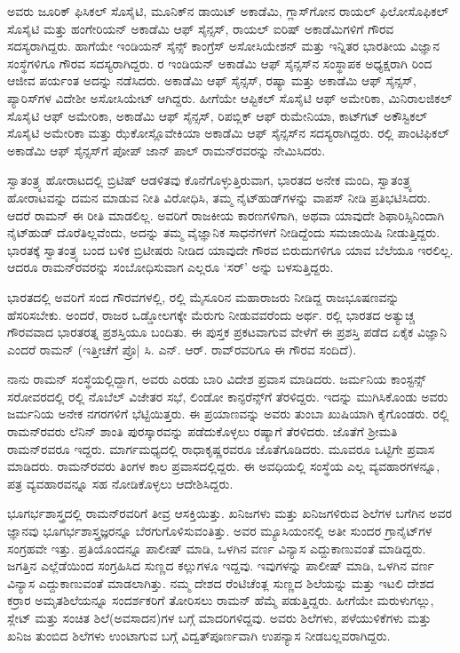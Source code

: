 ಅವರು ಜೂರಿಕ್ ಫಿಸಿಕಲ್ ಸೊಸೈಟಿ, ಮೂನಿಕ್‌ನ ಡಾಯಿಟ್ ಅಕಾಡೆಮಿ, ಗ್ಲಾಸ್‌ಗೋನ ರಾಯಲ್ ಫಿಲೋಸೊಫಿಕಲ್ ಸೊಸೈಟಿ ಮತ್ತು ಹಂಗೇರಿಯನ್ ಅಕಾಡೆಮಿ ಆಫ್ ಸೈನ್ಸಸ್, ರಾಯಲ್ ಐರಿಷ್ ಅಕಾಡೆಮಿಗಳಿಗೆ ಗೌರವ ಸದಸ್ಯರಾಗಿದ್ದರು. ಹಾಗೆಯೇ ಇಂಡಿಯನ್ ಸೈನ್ಸ್ ಕಾಂಗ್ರೆಸ್ ಅಸೋಸಿಯೇಶನ್ ಮತ್ತು ಇನ್ನಿತರ ಭಾರತೀಯ ವಿಜ್ಞಾನ ಸಂಸ್ಥೆಗಳಿಗೂ ಗೌರವ ಸದಸ್ಯರಾಗಿದ್ದರು.  ರ ಇಂಡಿಯನ್ ಅಕಾಡೆಮಿ ಆಫ್ ಸೈನ್ಸಸ್‌ನ ಸಂಸ್ಥಾಪಕ ಅಧ್ಯಕ್ಷರಾಗಿ  ರಿಂದ ಆಜೀವ ಪರ್ಯಂತ ಅದನ್ನು ನಡೆಸಿದರು. ಅಕಾಡೆಮಿ ಆಫ್ ಸೈನ್ಸಸ್, ರಷ್ಯಾ ಮತ್ತು ಅಕಾಡೆಮಿ ಆಫ್ ಸೈನ್ಸಸ್, ಪ್ಯಾರಿಸ್‍ಗಳ ವಿದೇಶೀ ಅಸೋಸಿಯೇಟ್ ಆಗಿದ್ದರು. ಹೀಗೆಯೇ ಆಪ್ಟಿಕಲ್ ಸೊಸೈಟಿ ಆಫ್ ಅಮೇರಿಕಾ, ಮಿನಿರಾಲಜಿಕಲ್ ಸೊಸೈಟಿ ಆಫ್ ಅಮೇರಿಕಾ, ಅಕಾಡೆಮಿ ಆಫ್ ಸೈನ್ಸಸ್, ರಿಪಬ್ಲಿಕ್ ಆಫ್ ರುಮೇನಿಯಾ, ಕಾಟ್‍ಗಟ್ ಅಕೌಸ್ಟಿಕಲ್ ಸೊಸೈಟಿ ಅಮೇರಿಕಾ ಮತ್ತು ಝೆಕೋಸ್ಲೊವೇಕಿಯಾ ಅಕಾಡೆಮಿ ಆಫ್ ಸೈನ್ಸಸ್‌ನ ಸದಸ್ಯರಾಗಿದ್ದರು.  ರಲ್ಲಿ ಪಾಂಟಿಫಿಕಲ್ ಅಕಾಡೆಮಿ ಆಫ್ ಸೈನ್ಸಸ್‌ಗೆ ಪೋಪ್ ಜಾನ್ ಪಾಲ್ ರಾಮನ್‍ರವರನ್ನು ನೇಮಿಸಿದರು.

ಸ್ವಾತಂತ್ರ್ಯ ಹೋರಾಟದಲ್ಲಿ ಬ್ರಿಟಿಷ್ ಆಡಳಿತವು ಕೊನೆಗೊಳ್ಳುತ್ತಿರುವಾಗ, ಭಾರತದ ಅನೇಕ ಮಂದಿ, ಸ್ವಾತಂತ್ರ್ಯ ಹೋರಾಟವನ್ನು ದಮನ ಮಾಡುವ ನೀತಿ ವಿರೋಧಿಸಿ, ತಮ್ಮ ನೈಟ್‍ಹುಡ್‍‌ಗಳನ್ನು ವಾಪಸ್ ನೀಡಿ ಪ್ರತಿಭಟಿಸಿದರು. ಆದರೆ ರಾಮನ್‍ ಈ ರೀತಿ ಮಾಡಲಿಲ್ಲ. ಅವರಿಗೆ ರಾಜಕೀಯ ಕಾರಣಗಳಿಗಾಗಿ, ಅಥವಾ ಯಾವುದೇ ಶಿಫಾರಿಸ್ಸಿನಿಂದಾಗಿ ನೈಟ್‍ಹುಡ್ ದೊರೆತಿಲ್ಲವೆಂದು, ಅದನ್ನು ತಮ್ಮ ವೈಜ್ಞಾನಿಕ ಸಾಧನೆಗಳಗೆ ನೀಡಿದ್ದೆಂದು ಸಮಜಾಯಿಷಿ ನೀಡುತ್ತಿದ್ದರು. ಭಾರತಕ್ಕೆ ಸ್ವಾತಂತ್ರ್ಯ ಬಂದ ಬಳಿಕ ಬ್ರಿಟೀಷರು ನೀಡಿದ ಯಾವುದೇ ಗೌರವ ಬಿರುದುಗಳಿಗೂ ಯಾವ ಬೆಲೆಯೂ ಇರಲಿಲ್ಲ. ಆದರೂ ರಾಮನ್‍ರವರನ್ನು ಸಂಬೋಧಿಸುವಾಗ ಎಲ್ಲರೂ ‘ಸರ್‍’ ಅನ್ನು ಬಳಸುತ್ತಿದ್ದರು.

ಭಾರತದಲ್ಲಿ ಅವರಿಗೆ ಸಂದ ಗೌರವಗಳಲ್ಲಿ,  ರಲ್ಲಿ ಮೈಸೂರಿನ ಮಹಾರಾಜರು ನೀಡಿದ್ದ ರಾಜಭೂಷಣವನ್ನು ಹೆಸರಿಸಬೇಕು. ಅಂದರೆ, ರಾಜರ ಒಡ್ಡೋಲಗಕ್ಕೇ ಮೆರುಗು ನೀಡುವವರೆಂದು ಅರ್ಥ. ರಲ್ಲಿ ಭಾರತದ ಅತ್ಯುಚ್ಚ ಗೌರವವಾದ ಭಾರತರತ್ನ ಪ್ರಶಸ್ತಿಯೂ ಬಂದಿತು. ಈ ಪುಸ್ತಕ ಪ್ರಕಟವಾಗುವ ವೇಳೆಗೆ ಈ ಪ್ರಶಸ್ತಿ ಪಡೆದ ಏಕೈಕ ವಿಜ್ಞಾನಿ ಎಂದರೆ ರಾಮನ್ (ಇತ್ತೀಚೆಗೆ ಪ್ರೊ| ಸಿ. ಎನ್. ಆರ್. ರಾವ್‌ರವರಿಗೂ ಈ ಗೌರವ ಸಂದಿದೆ).

ನಾನು ರಾಮನ್ ಸಂಸ್ಥೆಯಲ್ಲಿದ್ದಾಗ, ಅವರು ಎರಡು ಬಾರಿ ವಿದೇಶ ಪ್ರವಾಸ ಮಾಡಿದರು. ಜರ್ಮನಿಯ ಕಾಂಸ್ಟನ್ಸ್ ಸರೋವರದಲ್ಲಿ  ರಲ್ಲಿ ನೊಬೆಲ್ ವಿಜೇತರ ಸಭೆ, ಲಿಂಡೋ ಕಾನ್ಫರೆನ್ಸ್‌ಗೆ ತೆರಳಿದ್ದರು. ಇದನ್ನು ಮುಗಿಸಿಕೊಂಡು ಅವರು ಜರ್ಮನಿಯ ಅನೇಕ ನಗರಗಳಿಗೆ ಭೆಟ್ಟಿಯಿತ್ತರು. ಈ ಪ್ರಯಾಣವನ್ನು ಅವರು ತುಂಬಾ ಖುಷಿಯಾಗಿ ಕೈಗೊಂಡರು. ರಲ್ಲಿ ರಾಮನ್‍ರವರು ಲೆನಿನ್ ಶಾಂತಿ ಪುರಸ್ಕಾರವನ್ನು ಪಡೆದುಕೊಳ್ಳಲು ರಷ್ಯಾಗೆ ತೆರಳಿದರು. ಜೊತೆಗೆ ಶ‍್ರೀಮತಿ ರಾಮನ್‌ರವರೂ ಇದ್ದರು. ಮಾರ್ಗಮಧ‍್ಯದಲ್ಲಿ ರಾಧಾಕೃಷ್ಣರವರೂ ಜೊತೆಗೂಡಿದರು. ಮೂವರೂ ಒಟ್ಟಿಗೇ ಪ್ರವಾಸ ಮಾಡಿದರು. ರಾಮನ್‍ರವರು ತಿಂಗಳ ಕಾಲ ಪ್ರವಾಸದಲ್ಲಿದ್ದರು. ಈ ಅವಧಿಯಲ್ಲಿ ಸಂಸ್ಥೆಯ ಎಲ್ಲ ವ್ಯವಹಾರಗಳನ್ನೂ, ಪತ್ರ ವ್ಯವಹಾರವನ್ನೂ ಸಹ ನೋಡಿಕೊಳ್ಳಲು ಆದೇಶಿಸಿದ್ದರು.



ಭೂಗರ್ಭಶಾಸ್ತ್ರದಲ್ಲಿ ರಾಮನ್‍ರವರಿಗೆ ತೀವ್ರ ಆಸಕ್ತಿಯಿತ್ತು. ಖನಿಜಗಳು ಮತ್ತು ಖನಿಜಗಳಿರುವ ಶಿಲೆಗಳ ಬಗೆಗಿನ ಅವರ ಜ್ಞಾನವು ಭೂಗರ್ಭಶಾಸ್ತ್ರಜ್ಞರನ್ನೂ ಬೆರಗುಗೊಳಿಸುವಂತಿತ್ತು. ಅವರ ಮ್ಯೂಸಿಯಂನಲ್ಲಿ ಅತೀ ಸುಂದರ ಗ್ರಾನೈಟ್‌ಗಳ ಸಂಗ್ರಹವೇ ಇತ್ತು. ಪ್ರತಿಯೊಂದನ್ನೂ ಪಾಲೀಷ್ ಮಾಡಿ, ಒಳಗಿನ ವರ್ಣ ವಿನ್ಯಾಸ ಎದ್ದುಕಾಣುವಂತೆ ಮಾಡಿದ್ದರು. ಜಗತ್ತಿನ ಎಲ್ಲೆಡೆಯಿಂದ ಸಂಗ್ರಹಿಸಿದ ಸುಣ್ಣದ ಕಲ್ಲುಗಳೂ ಇದ್ದವು. ಇವುಗಳನ್ನು ಪಾಲೀಷ್ ಮಾಡಿ, ಒಳಗಿನ ವರ್ಣ ವಿನ್ಯಾಸ ಎದ್ದುಕಾಣುವಂತೆ ಮಾಡಲಾಗಿತ್ತು. ನಮ್ಮ ದೇಶದ ರೆಂಟಿಚೆಂತ್ಲ ಸುಣ್ಣದ ಶಿಲೆಯನ್ನು ಮತ್ತು ಇಟಲಿ ದೇಶದ ಕರ್ರಾರ ಅಮೃತಶಿಲೆಯನ್ನೂ ಸಂದರ್ಶಕರಿಗೆ ತೋರಿಸಲು ರಾಮನ್ ಹೆಮ್ಮೆ ಪಡುತ್ತಿದ್ದರು. ಹೀಗೆಯೇ ಮರುಳುಗಲ್ಲು, ಸ್ಲೇಟ್ ಮತ್ತು ಸಂಚಿತ ಶಿಲೆ(ಅವಸಾದನ)ಗಳ ಬಗ್ಗೆ ಮಾದರಿಗಳಿದ್ದವು. ಅವರು ಶಿಲೆಗಳು, ಪಳೆಯುಳಿಕೆಗಳು ಮತ್ತು ಖನಿಜ ತುಂಬಿದ ಶಿಲೆಗಳು ಉಂಟಾಗುವ ಬಗ್ಗೆ ವಿದ್ವತ್‍ಪೂರ್ಣವಾಗಿ ಉಪನ್ಯಾಸ ನೀಡಬಲ್ಲವರಾಗಿದ್ದರು.

